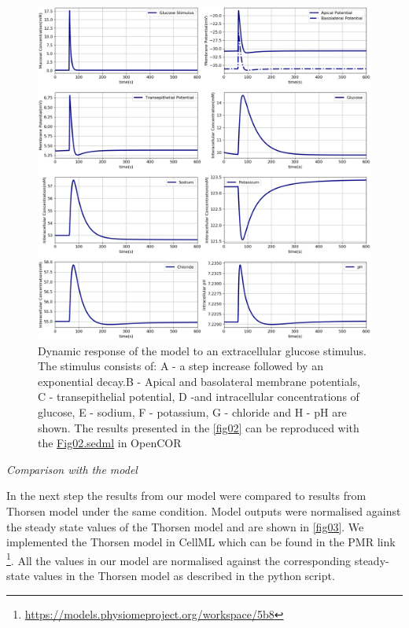 \documentclass[fleqn,10pt]{physiome}
\begin{document}
\begin{figure}[ht]
\centering
\includegraphics[width=0.8\linewidth]{fig02.png}
\caption{Dynamic response of the model to an extracellular
glucose stimulus. The stimulus consists of: A - a step increase
followed by an exponential decay.B - Apical and basolateral
membrane potentials, C - transepithelial potential, D -and intracellular
concentrations of glucose, E - sodium, F - potassium, G - chloride and H - pH are shown. The results presented in the \autoref{fig02} can be reproduced with the \href{https://models.physiomeproject.org/workspace/572/file/59488c15178b09bcb5b11f795383b1435f7b7ef1/SEDML_files/Fig02.sedml}{Fig02.sedml} in OpenCOR}
\label{fig02}
\end{figure}

\textit{Comparison with the \cite{thorsen2014transepithelial} model }\newline

In the next step the results from our model were compared to results from Thorsen model under the same condition. Model outputs were normalised against the steady state values of the Thorsen model and are shown in \autoref{fig03}. We implemented the Thorsen model in CellML which can be found in the PMR link \footnote{\url{https://models.physiomeproject.org/workspace/5b8}}. All the values in our model are normalised against the corresponding steady-state values in the Thorsen model as described in the python script. \newpage
\end{document}
